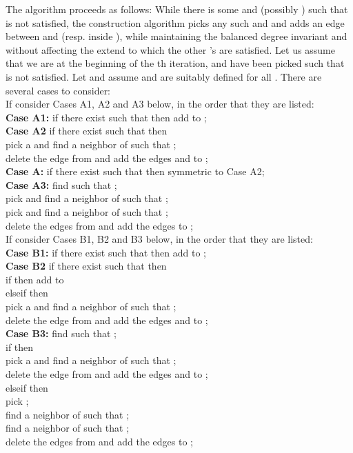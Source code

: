 \documentclass[12pt,a4paper]{article}
\theoremstyle{definition}
\theoremstyle{plain}
\begin{document}
The algorithm proceeds as follows: While there is some  and  (possibly )
such that  is not satisfied,
the construction algorithm picks any such  and 
and adds an edge between  and  (resp. inside ),
while maintaining the balanced degree invariant
and without affecting the extend to which the other 's
are satisfied.
Let us assume that we are at the beginning of the th
iteration, and  have been picked such that  is not satisfied.
Let  and assume  and  are suitably defined for all . 
There are several cases to consider:\smallskip \\
If  consider Cases A1, A2 and A3 below, 
in the order that they are listed:\\
{\bf Case A1:} if there exist 
such that  then add  to ;\\
{\bf Case A2} if there exist  
such that  then\\
pick a  and find a neighbor  of  
such that ;\\
delete the edge  from 
and add the edges  and  to ;\\
{\bf Case A:} if there exist 
such that  then symmetric to Case A2;\\
{\bf Case A3:} find  
such that ;\\
pick  and find a neighbor  of  
such that ;\\
pick  and find a neighbor  of 
such that ;\\
delete the edges  from  
and add the edges  to ;\smallskip\\
If  consider Cases B1, B2 and B3 below,
in the order that they are listed:\\
{\bf Case B1:} if there exist 
such that  then add  to ;\\
{\bf Case B2} if there exist 
such that  then\\
if  then add  to \\
elseif  then\\
pick a  and find a neighbor  of 
such that ;\\
delete the edge  from 
and add the edges  and  to ;\\
{\bf Case B3:} find 
such that ;\\
if  then\\
pick a  and find a neighbor  of 
such that ;\\
delete the edge  from 
and add the edges  and  to ;\\
elseif  then\\
pick ;\\
find a neighbor  of  such that ;\\
find a neighbor  of  such that ;\\
delete the edges  from 
and add the edges  to ;
\end{document}

